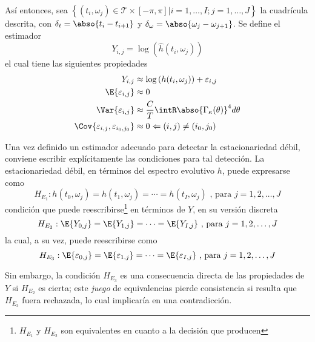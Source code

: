 Así entonces, sea
$\left\{ (t_i,\omega_j) \in \mathcal{T} \times [-\pi,\pi] | i = 1,\dots,I ; j=1,\dots,J \right\}$
la cuadrícula descrita, con $\delta_t= \abso{t_i - t_{i+1}}$ y 
$\delta_\omega = \abso{\omega_j-\omega_{j+1}}$. 
%
Se define el estimador
\begin{equation}
Y_{i,j} = \log\left(\widehat{h}(t_i,\omega_j)\right)
\end{equation}
%
el cual tiene las siguientes propiedades
%
\begin{align*}
Y_{i,j} &\approx \log\left(h(t_i,\omega_j)\right) + \varepsilon_{i,j} \\
\E{\varepsilon_{i,j}} &\approx 0 \\
\Var{\varepsilon_{i,j}} &\approx
\frac{C}{T} \intR \abso{\Gamma_\kappa(\theta)}^{4} d\theta \\
\Cov{\varepsilon_{i,j},\varepsilon_{i_0,j_0}} &\approx 0 
\Leftarrow (i,j)\neq (i_0,j_0)
\end{align*}


Una vez definido un estimador adecuado para detectar la estacionariedad débil, conviene escribir
explícitamente las condiciones para tal detección.
%
La estacionariedad débil, en términos del espectro evolutivo $h$, puede expresarse como
%
\begin{equation*}
H_{E_1} : h(t_0,\omega_j) = h(t_1,\omega_j) = \cdots = h(t_I,\omega_j)
\text{ , para } j = 1, 2, \dots , J
\end{equation*}
%
condición que puede reescribirse\footnote{$H_{E_1}$ y $H_{E_2}$ son equivalentes en cuanto a la
decisión que producen} en términos de $Y$, en su versión discreta
%
\begin{equation*}
H_{E_2} : \E{Y_{0,j}} = \E{Y_{1,j}} = \cdots = \E{Y_{I,j}} \text{ , para } j = 1, 2, \dots , J
\end{equation*}
%
la cual, a su vez, puede reescribirse como
\begin{equation*}
H_{E_3} : \E{\varepsilon_{0,j}} = \E{\varepsilon_{1,j}} = \cdots =
\E{\varepsilon_{I,j}} \text{ , para } j = 1, 2, \dots , J
\end{equation*}

Sin embargo, la condición $H_{E_3}$ es una consecuencia directa de las propiedades de $Y$ si
$H_{E_2}$ es cierta; este \textit{juego} de equivalencias pierde consistencia si resulta que
$H_{E_3}$ fuera rechazada, lo cual implicaría en una contradicción.

